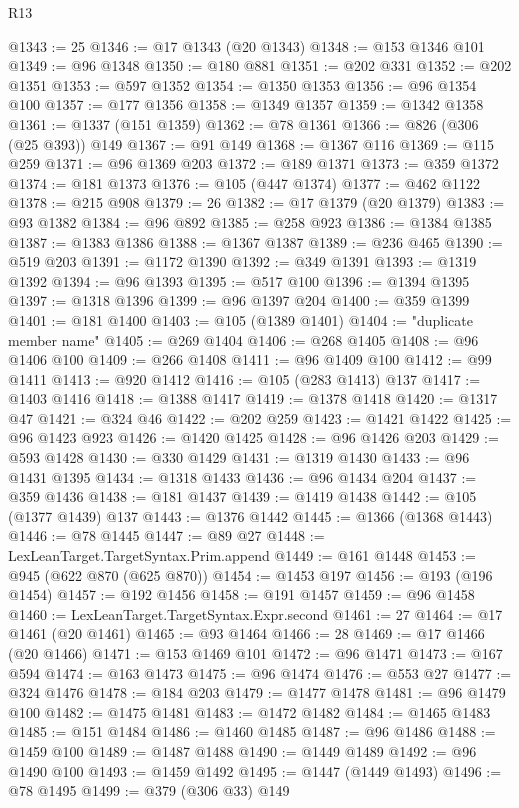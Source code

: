\begin{lexlean}{R13}
\begin{coremodule}
@1343 := 25
@1346 := @17 @1343 (@20 @1343)
@1348 := @153 @1346 @101
@1349 := @96 @1348
@1350 := @180 @881
@1351 := @202 @331
@1352 := @202 @1351
@1353 := @597 @1352
@1354 := @1350 @1353
@1356 := @96 @1354 @100
@1357 := @177 @1356
@1358 := @1349 @1357
@1359 := @1342 @1358
@1361 := @1337 (@151 @1359)
@1362 := @78 @1361
@1366 := @826 (@306 (@25 @393)) @149
@1367 := @91 @149
@1368 := @1367 @116
@1369 := @115 @259
@1371 := @96 @1369 @203
@1372 := @189 @1371
@1373 := @359 @1372
@1374 := @181 @1373
@1376 := @105 (@447 @1374)
@1377 := @462 @1122
@1378 := @215 @908
@1379 := 26
@1382 := @17 @1379 (@20 @1379)
@1383 := @93 @1382
@1384 := @96 @892
@1385 := @258 @923
@1386 := @1384 @1385
@1387 := @1383 @1386
@1388 := @1367 @1387
@1389 := @236 @465
@1390 := @519 @203
@1391 := @1172 @1390
@1392 := @349 @1391
@1393 := @1319 @1392
@1394 := @96 @1393
@1395 := @517 @100
@1396 := @1394 @1395
@1397 := @1318 @1396
@1399 := @96 @1397 @204
@1400 := @359 @1399
@1401 := @181 @1400
@1403 := @105 (@1389 @1401)
@1404 := "duplicate member name"
@1405 := @269 @1404
@1406 := @268 @1405
@1408 := @96 @1406 @100
@1409 := @266 @1408
@1411 := @96 @1409 @100
@1412 := @99 @1411
@1413 := @920 @1412
@1416 := @105 (@283 @1413) @137
@1417 := @1403 @1416
@1418 := @1388 @1417
@1419 := @1378 @1418
@1420 := @1317 @47
@1421 := @324 @46
@1422 := @202 @259
@1423 := @1421 @1422
@1425 := @96 @1423 @923
@1426 := @1420 @1425
@1428 := @96 @1426 @203
@1429 := @593 @1428
@1430 := @330 @1429
@1431 := @1319 @1430
@1433 := @96 @1431 @1395
@1434 := @1318 @1433
@1436 := @96 @1434 @204
@1437 := @359 @1436
@1438 := @181 @1437
@1439 := @1419 @1438
@1442 := @105 (@1377 @1439) @137
@1443 := @1376 @1442
@1445 := @1366 (@1368 @1443)
@1446 := @78 @1445
@1447 := @89 @27
@1448 := LexLeanTarget.TargetSyntax.Prim.append
@1449 := @161 @1448
@1453 := @945 (@622 @870 (@625 @870))
@1454 := @1453 @197
@1456 := @193 (@196 @1454)
@1457 := @192 @1456
@1458 := @191 @1457
@1459 := @96 @1458
@1460 := LexLeanTarget.TargetSyntax.Expr.second
@1461 := 27
@1464 := @17 @1461 (@20 @1461)
@1465 := @93 @1464
@1466 := 28
@1469 := @17 @1466 (@20 @1466)
@1471 := @153 @1469 @101
@1472 := @96 @1471
@1473 := @167 @594
@1474 := @163 @1473
@1475 := @96 @1474
@1476 := @553 @27
@1477 := @324 @1476
@1478 := @184 @203
@1479 := @1477 @1478
@1481 := @96 @1479 @100
@1482 := @1475 @1481
@1483 := @1472 @1482
@1484 := @1465 @1483
@1485 := @151 @1484
@1486 := @1460 @1485
@1487 := @96 @1486
@1488 := @1459 @100
@1489 := @1487 @1488
@1490 := @1449 @1489
@1492 := @96 @1490 @100
@1493 := @1459 @1492
@1495 := @1447 (@1449 @1493)
@1496 := @78 @1495
@1499 := @379 (@306 @33) @149

\end{coremodule}
\end{lexlean}
